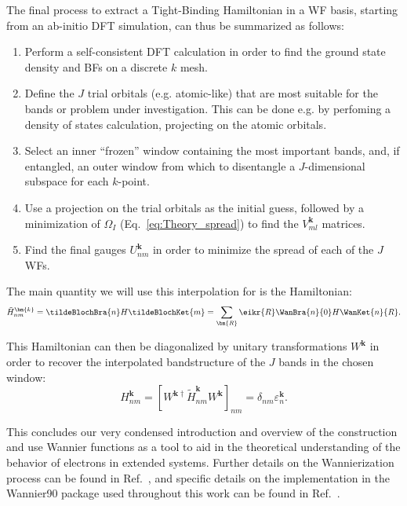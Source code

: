 The final process to extract a Tight-Binding Hamiltonian in a WF basis, starting from an ab-initio DFT simulation, can thus be summarized as follows:
\begin{enumerate}
	\item Perform a self-consistent DFT calculation in order to find the ground state density and BFs on a discrete $k$ mesh.
	\item Define the $J$ trial orbitals (e.g. atomic-like) that are most suitable for the bands or problem under investigation. This can be done e.g. by perfoming a density of states calculation, projecting on the atomic orbitals.
	\item Select an inner ``frozen'' window containing the most important bands, and, if entangled, an outer window from which to disentangle a $J$-dimensional subspace for each $k$-point.
	\item Use a projection on the trial orbitals as the initial guess, followed by a minimization of $\Omega_I$ (Eq.~\eqref{eq:Theory_spread}) to find the $V_{ml}^{\bm{k}}$ matrices.
	\item Find the final gauges $U_{nm}^{\bm{k}}$ in order to minimize the spread of each of the $J$ WFs.
\end{enumerate}

The main quantity we will use this interpolation for is the Hamiltonian:
\begin{equation}
	\label{eq:Theory_waninterp}
	\tilde{H}_{nm}^{\bm{k}} = \tildeBlochBra{n} H \tildeBlochKet{m} = \sum_{\bm{R}} \eikr{R} \WanBra{n}{0}H\WanKet{n}{R}.
\end{equation}

This Hamiltonian can then be diagonalized by unitary transformations $W^{\bm{k}}$ in order to recover the interpolated bandstructure of the $J$ bands in the chosen window:
\begin{equation}
H_{nm}^{\bm{k}} = [W^{\bm{k}\dagger} \tilde{H}_{nm}^{\bm{k}} W^{\bm{k}}]_{nm} = \delta_{nm} \varepsilon_{n}^{\bm{k}}.
\end{equation}

This concludes our very condensed introduction and overview of the construction and use Wannier functions as a tool to aid in the theoretical understanding of the behavior of electrons in extended systems.
Further details on the Wannierization process can be found in Ref.~\cite{Marzari2012}, and specific details on the implementation in the Wannier90 package used throughout this work can be found in Ref.~\cite{Mostofi2014AnFunctions}.

